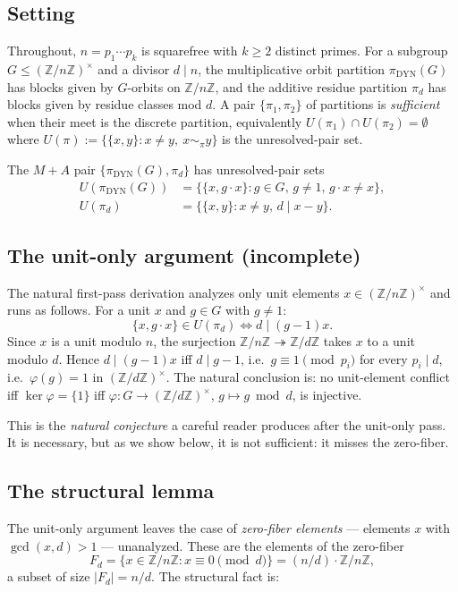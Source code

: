 \documentclass[11pt,reqno]{amsart}
\theoremstyle{plain}
\theoremstyle{definition}
\newcommand{\Z}{\mathbb{Z}}
\newcommand{\Zn}{\Z/n\Z}
\newcommand{\Zns}{(\Z/n\Z)^{\times}}
\newcommand{\DYN}{\mathrm{DYN}}
\begin{document}
\subsection{Setting}

Throughout, $n = p_1 \cdots p_k$ is squarefree with $k \geq 2$ distinct primes. For a subgroup $G \leq \Zns$ and a divisor $d \mid n$, the multiplicative orbit partition $\pi_{\DYN}(G)$ has blocks given by $G$-orbits on $\Zn$, and the additive residue partition $\pi_d$ has blocks given by residue classes mod $d$. A pair $\{\pi_1, \pi_2\}$ of partitions is \emph{sufficient} when their meet is the discrete partition, equivalently $U(\pi_1) \cap U(\pi_2) = \emptyset$ where $U(\pi) := \{\{x, y\} : x \neq y,\ x \sim_{\pi} y\}$ is the unresolved-pair set.

The $M{+}A$ pair $\{\pi_{\DYN}(G), \pi_d\}$ has unresolved-pair sets
\begin{align*}
U(\pi_{\DYN}(G)) &= \{\{x, g \cdot x\} : g \in G,\, g \neq 1,\, g \cdot x \neq x\},\\
U(\pi_d) &= \{\{x,y\} : x \neq y,\, d \mid x - y\}.
\end{align*}

\subsection{The unit-only argument (incomplete)}

The natural first-pass derivation analyzes only unit elements $x \in \Zns$ and runs as follows. For a unit $x$ and $g \in G$ with $g \neq 1$:
\[
\{x, g \cdot x\} \in U(\pi_d) \iff d \mid (g-1) x.
\]
Since $x$ is a unit modulo $n$, the surjection $\Zn \twoheadrightarrow \Z/d\Z$ takes $x$ to a unit modulo $d$. Hence $d \mid (g-1)x$ iff $d \mid g - 1$, i.e.\ $g \equiv 1 \pmod{p_i}$ for every $p_i \mid d$, i.e.\ $\varphi(g) = 1$ in $(\Z/d\Z)^{\times}$. The natural conclusion is: no unit-element conflict iff $\ker \varphi = \{1\}$ iff $\varphi \colon G \to (\Z/d\Z)^{\times}$, $g \mapsto g \bmod d$, is injective.

This is the \emph{natural conjecture} a careful reader produces after the unit-only pass. It is necessary, but as we show below, it is not sufficient: it misses the zero-fiber.

\subsection{The structural lemma}

The unit-only argument leaves the case of \emph{zero-fiber elements} --- elements $x$ with $\gcd(x, d) > 1$ --- unanalyzed. These are the elements of the zero-fiber
\[
F_d = \{x \in \Zn : x \equiv 0 \pmod d\} = (n/d) \cdot \Zn,
\]
a subset of size $|F_d| = n/d$. The structural fact is:
\end{document}
